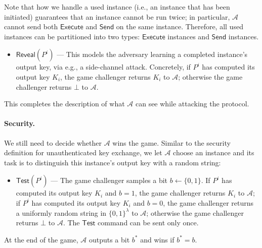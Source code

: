 \documentclass{article}
\newcommand{\adv}{\mathcal{A}}
\newcommand{\Execute}{\mathsf{Execute}}
\newcommand{\Send}{\mathsf{Send}}
\newcommand{\Reveal}{\mathsf{Reveal}}
\newcommand{\Test}{\mathsf{Test}}
\begin{document}
Note that how we handle a used instance (i.e., an instance that has been initiated) guarantees that an instance cannot be run twice; in particular, $\adv$ cannot send both $\Execute$ and $\Send$ on the same instance. Therefore, all used instances can be partitioned into two types: $\Execute$ instances and $\Send$ instances.
\begin{itemize}
  \item $\Reveal(P^i)$ --- This models the adversary learning a completed instance's output key, via e.g., a side-channel attack. Concretely, if $P^i$ has computed its output key $K_i$, the game challenger returns $K_i$ to $\adv$; otherwise the game challenger returns $\bot$ to $\adv$.
\end{itemize}

This completes the description of what $\adv$ can see while attacking the protocol.
\paragraph{Security.}
We still need to decide whether $\adv$ wins the game. Similar to the security definition for unauthenticated key exchange, we let $\adv$ choose an instance and its task is to distinguish this instance's output key with a random string:
\begin{itemize}
  \item $\Test(P^i)$ --- The game challenger samples a bit $b \gets \{0,1\}$. If $P^i$ has computed its output key $K_i$ and $b = 1$, the game challenger returns $K_i$ to $\adv$; if $P^i$ has computed its output key $K_i$ and $b = 0$, the game challenger returns a uniformly random string in $\{0,1\}^\lambda$ to $\adv$; otherwise the game challenger returns $\bot$ to $\adv$. The $\Test$ command can be sent only once.
\end{itemize}
At the end of the game, $\adv$ outputs a bit $b^*$ and wins if $b^* = b$.
\end{document}
